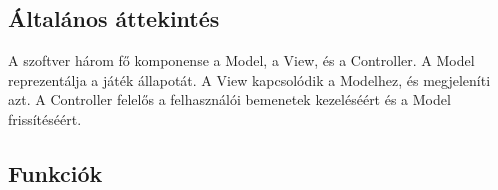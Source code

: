 \subsection{Általános áttekintés}
A szoftver három fő komponense a Model, a View, és a Controller. A Model reprezentálja a játék állapotát. A View kapcsolódik a Modelhez, és megjeleníti azt. A Controller felelős a felhasználói bemenetek kezeléséért és a Model frissítéséért.

\subsection{Funkciók}
